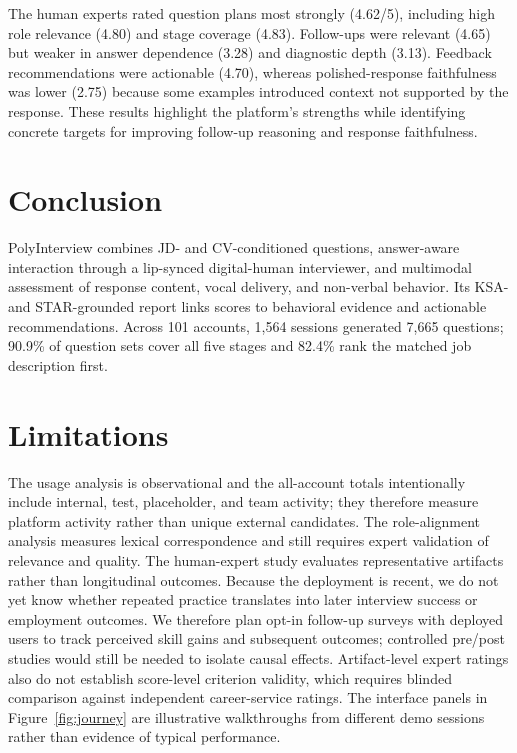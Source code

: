 \documentclass[11pt]{article}
\begin{document}


The human experts rated question plans most strongly (4.62/5), including high role relevance (4.80) and stage coverage (4.83). Follow-ups were relevant (4.65) but weaker in answer dependence (3.28) and diagnostic depth (3.13). Feedback recommendations were actionable (4.70), whereas polished-response faithfulness was lower (2.75) because some examples introduced context not supported by the response. These results highlight the platform's strengths while identifying concrete targets for improving follow-up reasoning and response faithfulness.

\section{Conclusion}
PolyInterview combines JD- and CV-conditioned questions, answer-aware interaction through a lip-synced digital-human interviewer, and multimodal assessment of response content, vocal delivery, and non-verbal behavior. Its KSA- and STAR-grounded report links scores to behavioral evidence and actionable recommendations. Across 101 accounts, 1{,}564 sessions generated 7{,}665 questions; 90.9\% of question sets cover all five stages and 82.4\% rank the matched job description first.

\clearpage
\section*{Limitations}
The usage analysis is observational and the all-account totals intentionally include internal, test, placeholder, and team activity; they therefore measure platform activity rather than unique external candidates. The role-alignment analysis measures lexical correspondence and still requires expert validation of relevance and quality. The human-expert study evaluates representative artifacts rather than longitudinal outcomes. Because the deployment is recent, we do not yet know whether repeated practice translates into later interview success or employment outcomes. We therefore plan opt-in follow-up surveys with deployed users to track perceived skill gains and subsequent outcomes; controlled pre/post studies would still be needed to isolate causal effects. Artifact-level expert ratings also do not establish score-level criterion validity, which requires blinded comparison against independent career-service ratings. The interface panels in Figure~\ref{fig:journey} are illustrative walkthroughs from different demo sessions rather than evidence of typical performance.
\end{document}
